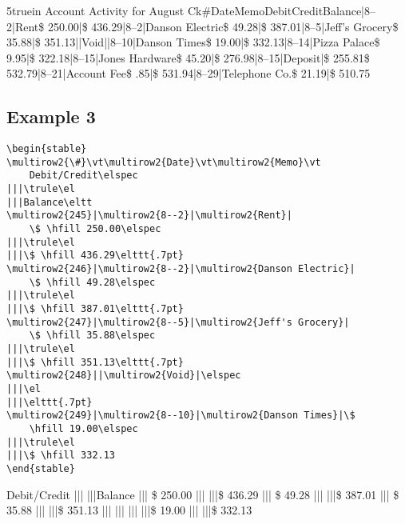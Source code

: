 \documentclass{article}
\begin{document}
\begin{stableto}{5truein}
 \hfill Account Activity for August\hfill\eltt
Ck\#\vt Date\vt Memo\vtt Debit\vt Credit\vtt Balance|8--2|Rent\vtt\$ \hfill 250.00|\vtt\$ \hfill 436.29|8--2|Danson Electric\vtt\$ \hfill 49.28|\vtt\$ \hfill 387.01|8--5|Jeff's Grocery\vtt\$ \hfill 35.88|\vtt\$ \hfill 351.13||Void\vtt|\vtt{}|8--10|Danson Times\vtt\$ \hfill 19.00|\vtt\$ \hfill 332.13|8--14|Pizza Palace\vtt\$ \hfill 9.95|\vtt\$ \hfill 322.18|8--15|Jones Hardware\vtt\$ \hfill 45.20|\vtt\$ \hfill 276.98|8--15|Deposit\vtt|\$ \hfill 255.81\vtt\$ \hfill 532.79|8--21|Account Fee\vtt\$ \hfill .85|\vtt\$ \hfill 531.94|8--29|Telephone Co.\vtt\$ \hfill 21.19|\vtt\$ \hfill 510.75
\end{stableto}

\subsection{Example 3}

\begin{verbatim}
\begin{stable}
\multirow2{\#}\vt\multirow2{Date}\vt\multirow2{Memo}\vt 
	Debit/Credit\elspec
|||\trule\el
|||Balance\eltt
\multirow2{245}|\multirow2{8--2}|\multirow2{Rent}|
	\$ \hfill 250.00\elspec
|||\trule\el
|||\$ \hfill 436.29\elttt{.7pt}
\multirow2{246}|\multirow2{8--2}|\multirow2{Danson Electric}|
	\$ \hfill 49.28\elspec
|||\trule\el
|||\$ \hfill 387.01\elttt{.7pt}
\multirow2{247}|\multirow2{8--5}|\multirow2{Jeff's Grocery}|
	\$ \hfill 35.88\elspec
|||\trule\el
|||\$ \hfill 351.13\elttt{.7pt}
\multirow2{248}||\multirow2{Void}|\elspec
|||\el
|||\elttt{.7pt}
\multirow2{249}|\multirow2{8--10}|\multirow2{Danson Times}|\$
	\hfill 19.00\elspec
|||\trule\el
|||\$ \hfill 332.13
\end{stable}
\end{verbatim}

\begin{stable}
\vt{}\vt{}\vt 
	Debit/Credit\elspec
|||\trule\el
|||Balance\eltt
{}|||
	\$ \hfill 250.00\elspec
|||\trule\el
|||\$ \hfill 436.29\elttt{.7pt}
|||
	\$ \hfill 49.28\elspec
|||\trule\el
|||\$ \hfill 387.01\elttt{.7pt}
|||
	\$ \hfill 35.88\elspec
|||\trule\el
|||\$ \hfill 351.13\elttt{.7pt}
|||\elspec
|||\el
|||\elttt{.7pt}
|||\$
	\hfill 19.00\elspec
|||\trule\el
|||\$ \hfill 332.13
\end{stable}
\end{document}

